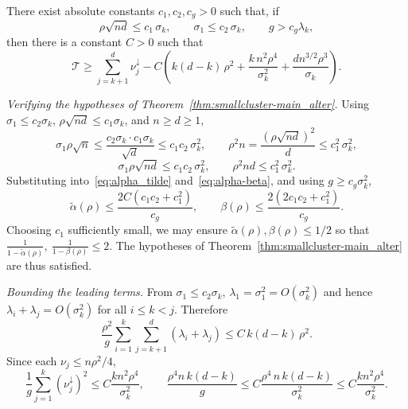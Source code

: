 \documentclass[10pt,a4paper]{amsart}
\newcommand{\Tcal}{\mathcal{T}}
\newenvironment{proof}{\par\noindent{\bf Proof\ }}{\hfill\BlackBox\par\medskip}
\newcommand{\rbr}[1]{\left(#1\right)}
\begin{document}
\begin{corollary}\label{cor:smallcluster_alter}
There exist absolute constants $c_1, c_2, c_g > 0$ such that, if
\begin{equation*}
    \rho\sqrt{nd} \le c_1\,\sigma_k, \qquad \sigma_1 \le c_2\,\sigma_k, \qquad g > c_g \lambda_k,
\end{equation*}
then there is a constant $C > 0$ such that
\begin{equation*}
    \Tcal \ge \sum_{j=k+1}^{d}\nu_j^\downarrow - C\rbr{k(d-k)\,\rho^2 + \frac{k\,n^2 \rho^4}{\sigma_k^2} + \frac{d n^{3/2}\rho^3}{\sigma_k}}.
\end{equation*}
\end{corollary}

\begin{proof}

\emph{Verifying the hypotheses of Theorem~\ref{thm:smallcluster-main_alter}.} Using $\sigma_1 \le c_2\sigma_k$, $\rho\sqrt{nd} \le c_1\sigma_k$, and $n \ge d \ge 1$,
\begin{equation*}
    \sigma_1\rho\sqrt n \le \frac{c_2\sigma_k\cdot c_1\sigma_k}{\sqrt d} \le c_1 c_2\,\sigma_k^2,\qquad
    \rho^2 n = \frac{(\rho\sqrt{nd})^2}{d} \le c_1^2\,\sigma_k^2,
\end{equation*}
\begin{equation*}
    \sigma_1\rho\sqrt{nd} \le c_1 c_2\,\sigma_k^2,\qquad
    \rho^2 nd \le c_1^2\,\sigma_k^2.
\end{equation*}
Substituting into~\eqref{eq:alpha_tilde} and~\eqref{eq:alpha-beta}, and using $g \ge c_g\sigma_k^2$,
\begin{equation*}
    \tilde\alpha(\rho) \le \frac{2C(c_1 c_2 + c_1^2)}{c_g},\qquad
    \beta(\rho) \le \frac{2(2 c_1 c_2 + c_1^2)}{c_g}.
\end{equation*}
Choosing $c_1$ sufficiently small, we may ensure $\tilde\alpha(\rho), \beta(\rho) \le 1/2$ so that $\tfrac{1}{1-\tilde\alpha(\rho)},\ \tfrac{1}{1-\beta(\rho)} \le 2$. The hypotheses of Theorem~\ref{thm:smallcluster-main_alter} are thus satisfied.

\emph{Bounding the leading terms.} From $\sigma_1 \le c_2\sigma_k$, $\lambda_1 = \sigma_1^2 = O(\sigma_k^2)$ and hence $\lambda_i + \lambda_j = O(\sigma_k^2)$ for all $i \le k < j$. Therefore
\begin{equation*}
    \frac{\rho^2}{g}\sum_{i=1}^{k}\sum_{j=k+1}^{d}(\lambda_i+\lambda_j) \le C\,k(d-k)\,\rho^2.
\end{equation*}
Since each $\nu_j \le n\rho^2/4$,
\begin{equation*}
    \frac{1}{g}\sum_{j=1}^{k}(\nu_j^\downarrow)^2 \le C\frac{kn^2\rho^4}{\sigma_k^2}, \qquad \frac{\rho^4 n\,k(d-k)}{g} \le C\frac{\rho^4\,n\,k(d-k)}{\sigma_k^2} \le C\frac{kn^2\rho^4}{\sigma_k^2}.
\end{equation*}


\end{proof}
\end{document}
